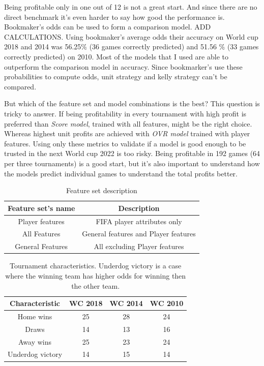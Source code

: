 Being profitable only in one out of 12 is not a great start. And since there are no direct benchmark it's even harder to say how good the performance is. Bookmaker's odds can be used to form a comparison model. ADD CALCULATIONS. Using bookmaker's average odds their accuracy on World cup 2018 and 2014 was 56.25\% (36 games correctly predicted) and 51.56  \% (33 games correctly predicted) on 2010. Most of the models that I used are able to outperform the comparison model in accuracy. Since bookmarker's use these probabilities to compute odds,  unit strategy and kelly strategy can't be compared.

But which of the feature set and model combinations is the best? This question is tricky to answer. If being profitability in every tournament with high profit is preferred than \textit{Score model}, trained with all features, might be the right choice. Whereas highest unit profits are achieved with \textit{OVR model} trained with player features. Using only these metrics to validate if a model is good enough to be trusted in the next World cup 2022 is too risky. Being profitable in 192 games (64 per three tournaments) is a good start, but it's also important to understand how the models predict individual games to understand the total profits better.

\begin{table}
    \caption{Feature set description}
    \begin{tabular}{| c | c|}
        \hline
        Feature set's name & Description \\
        \hline
        Player features & FIFA player attributes only \\
        All Features & General features and Player features \\
        General Features & All excluding Player features \\
        \hline
    \end{tabular}
    \label{table:featuresetlist}
\end{table}

\begin{table}
    \caption{Tournament characteristics. Underdog victory is a case where the winning team has higher odds for winning then the other team.}
    \begin{tabular}{| c | c|c | c|}
        \hline
        Characteristic & \textbf{WC 2018} & \textbf{WC 2014} & \textbf{WC 2010}\\
        \hline
        Home wins & 25 & 28 & 24\\
        Draws & 14 & 13 & 16\\
        Away wins & 25 & 23 & 24\\
        Underdog victory  & 14 & 15 & 14\\
        \hline
    \end{tabular}
    \label{table:tournamentcharacteristics}
\end{table}


